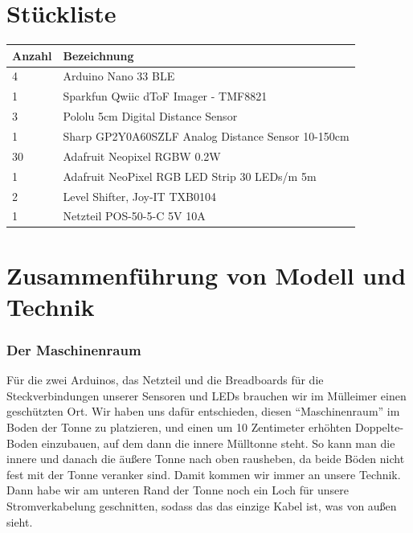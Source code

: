 
\section{Stückliste}
    \begin{table}[H]
        \centering
        \begin{tabularx}{\textwidth}{ | l | X | }\hline
            \textbf{Anzahl} & \textbf{Bezeichnung} \\\hline
            4               & Arduino Nano 33 BLE \\\hline
            1               & Sparkfun Qwiic dToF Imager - TMF8821 \\\hline
            3               & Pololu 5cm Digital Distance Sensor \\\hline
            1               & Sharp GP2Y0A60SZLF Analog Distance Sensor 10-150cm \\\hline
            30              & Adafruit Neopixel RGBW 0.2W \\\hline            1               & Adafruit NeoPixel RGB LED Strip 30 LEDs/m 5m \\\hline
            2               & Level Shifter, Joy-IT TXB0104 \\\hline
            1               & Netzteil POS-50-5-C 5V 10A \\\hline
        \end{tabularx}
    \end{table}

\section{Zusammenführung von Modell und Technik}

    \subsubsection{Der Maschinenraum}
        
        Für die zwei Arduinos, das Netzteil und die Breadboards für die Steckverbindungen unserer Sensoren und LEDs brauchen wir im Mülleimer einen geschützten Ort. Wir haben uns dafür entschieden, diesen \enquote{Maschinenraum} im Boden der Tonne zu platzieren, und einen um 10 Zentimeter erhöhten Doppelte-Boden einzubauen, auf dem dann die innere Mülltonne steht.
        So kann man die innere und danach die äußere Tonne nach oben rausheben, da beide Böden nicht fest mit der Tonne veranker sind.
        Damit kommen wir immer an unsere Technik.
        Dann habe wir am unteren Rand der Tonne noch ein Loch für unsere Stromverkabelung geschnitten, sodass das das einzige Kabel ist, was von außen sieht.

